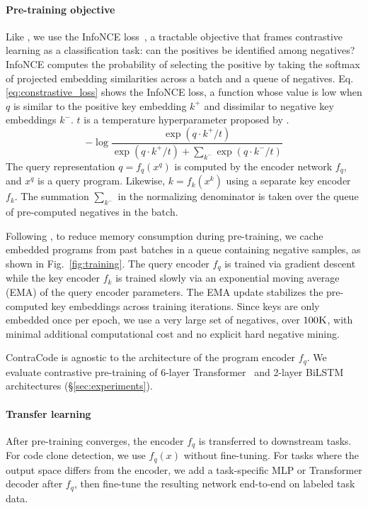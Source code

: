 \documentclass[11pt]{article}
\newcommand{\ours}[0]{ContraCode}
\begin{document}
\paragraph{Pre-training objective}
Like \citet{he2019momentum}, we use the InfoNCE loss~\citep{cpcv1_oord2018representation}, a tractable objective that frames contrastive learning as a classification task: can the positives be identified among negatives? InfoNCE computes the probability of selecting the positive by taking the softmax of projected embedding similarities across a batch and a queue of negatives.
Eq. \eqref{eq:constrastive_loss} shows the InfoNCE loss, a function whose value is low when $q$ is similar to the positive key embedding $k^{+}$ and dissimilar to negative key embeddings $k^{-}$. $t$ is a temperature hyperparameter proposed by \citet{wu2018unsupervised}.
\begin{equation}\label{eq:constrastive_loss}
-\log \frac{\exp(q \cdot k^{+}/t)}{\exp(q \cdot k^{+}/t) + \sum_{k^{-}} \exp(q \cdot k^{-}/t)}
\end{equation}
The query representation $q = f_{q}(x^{q})$ is computed by the encoder network $f_q$, and $x^{q}$ is a query program. Likewise, $k = f_{k}(x^{k})$ using a separate key encoder $f_{k}$.
The summation $\sum_{k^-}$ in the normalizing denominator is taken over the queue of pre-computed negatives in the batch.

Following \citet{he2019momentum}, to reduce memory consumption during pre-training, we cache embedded programs from past batches in a queue containing negative samples, as shown in Fig.~\ref{fig:training}.
The query encoder $f_q$ is trained via gradient descent while the key encoder $f_k$ is trained slowly via an exponential moving average (EMA) of the query encoder parameters. The EMA update stabilizes the pre-computed key embeddings across training iterations. Since keys are only embedded once per epoch, we use a very large set of negatives, over $100\textsc{K}$, with minimal additional computational cost and no explicit hard negative mining.

\ours{} is agnostic to the architecture of the program encoder $f_q$. We evaluate contrastive pre-training of 6-layer Transformer~\citep{vaswani2017attention} and 2-layer BiLSTM~\citep{schuster1997bidirectional, huang2015bidirectional} architectures (\S\ref{sec:experiments}).

\paragraph{Transfer learning} After pre-training converges, the encoder $f_q$ is transferred to downstream tasks. For code clone detection, we use $f_q(x)$ without fine-tuning. For tasks where the output space differs from the encoder, we add a task-specific MLP or Transformer decoder after $f_q$, then fine-tune the resulting network end-to-end on labeled task data.
\end{document}
